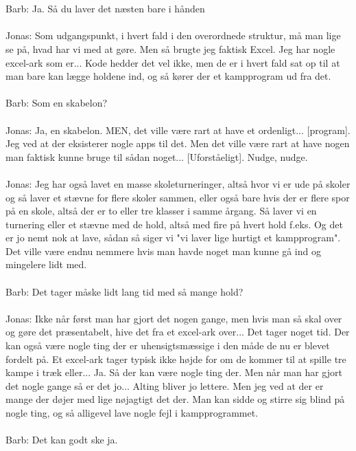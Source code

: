 \\\\
Barb: Ja. Så du laver det næsten bare i hånden
\\\\
Jonas: Som udgangspunkt, i hvert fald i den overordnede struktur, må man lige se på, hvad har vi med at gøre. Men så brugte jeg faktisk Excel. Jeg har nogle excel-ark som er... Kode hedder det vel ikke, men de er i hvert fald sat op til at man bare kan lægge holdene ind, og så kører der et kampprogram ud fra det.
\\\\
Barb: Som en skabelon?
\\\\
Jonas: Ja, en skabelon. MEN, det ville være rart at have et ordenligt... [program]. Jeg ved at der eksisterer nogle apps til det. Men det ville være rart at have nogen man faktisk kunne bruge til sådan noget... [Uforståeligt]. Nudge, nudge.
\\\\
Jonas: Jeg har også lavet en masse skoleturneringer, altså hvor vi er ude på skoler og så laver et stævne for flere skoler sammen, eller også bare hvis der er flere spor på en skole, altså der er to eller tre klasser i samme årgang. Så laver vi en turnering eller et stævne med de hold, altså med fire på hvert hold f.eks. Og det er jo nemt nok at lave, sådan så siger vi "vi laver lige hurtigt et kampprogram". Det ville være endnu nemmere hvis man havde noget man kunne gå ind og mingelere lidt med. 
\\\\
Barb: Det tager måske lidt lang tid med så mange hold?
\\\\
Jonas: Ikke når først man har gjort det nogen gange, men hvis man så skal over og gøre det præsentabelt, hive det fra et excel-ark over... Det tager noget tid. Der kan også være nogle ting der er uhensigtsmæssige i den måde de nu er blevet fordelt på. Et excel-ark tager typisk ikke højde for om de kommer til at spille tre kampe i træk eller... Ja. Så der kan være nogle ting der. Men når man har gjort det nogle gange så er det jo... Alting bliver jo lettere. Men jeg ved at der er mange der døjer med lige nøjagtigt det der. Man kan sidde og stirre sig blind på nogle ting, og så alligevel lave nogle fejl i kampprogrammet. 
\\\\
Barb: Det kan godt ske ja.
\\\\
